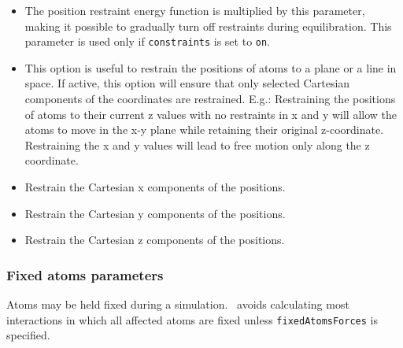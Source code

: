 \begin{itemize}
\item
{}
{The position restraint energy function is multiplied by this parameter,
making it possible to gradually turn off restraints during equilibration.
This parameter is used only if {\tt constraints} is set to 
{\tt on}.}

\item
{}
{This option is useful to restrain the positions of atoms to a plane or a line in space. If active,
 this option will ensure that only selected Cartesian components of the coordinates are restrained.
 E.g.: Restraining the positions of atoms to their current z values with no restraints
 in x and y will allow the atoms to move in the x-y plane while retaining their original z-coordinate.
 Restraining the x and y values will lead to free motion only along the z coordinate.}

\item
{}
{Restrain the Cartesian x components of the positions.}
\item
{}
{Restrain the Cartesian y components of the positions.}
\item
{}
{Restrain the Cartesian z components of the positions.}

\end{itemize}

\subsubsection{Fixed atoms parameters}

Atoms may be held fixed during a simulation.  \NAMD\ avoids calculating most interactions in which all affected atoms are fixed unless {\tt fixedAtomsForces} is specified.

